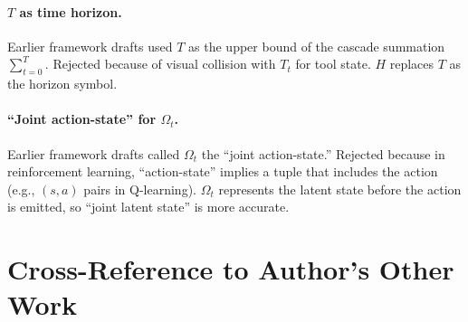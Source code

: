 \documentclass[11pt]{article}
\begin{document}
\paragraph{$T$ as time horizon.} Earlier framework drafts used $T$ as the upper bound of the cascade summation $\sum_{t=0}^T$. Rejected because of visual collision with $T_t$ for tool state. $H$ replaces $T$ as the horizon symbol.

\paragraph{``Joint action-state'' for $\Omega_t$.} Earlier framework drafts called $\Omega_t$ the ``joint action-state.'' Rejected because in reinforcement learning, ``action-state'' implies a tuple that includes the action (e.g., $(s, a)$ pairs in Q-learning). $\Omega_t$ represents the latent state before the action is emitted, so ``joint latent state'' is more accurate.

\section{Cross-Reference to Author's Other Work}
\end{document}
